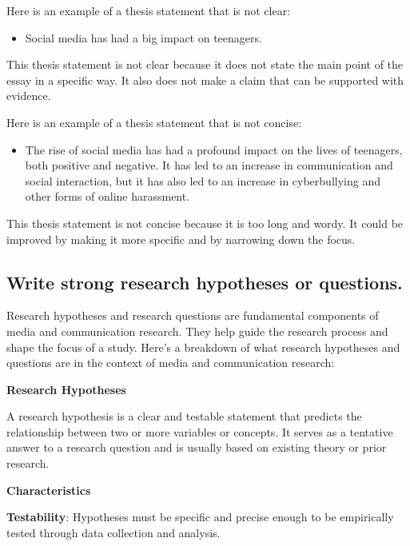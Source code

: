 \documentclass[
  b5paper]{book}
\providecommand{\tightlist}{%
  \setlength{\itemsep}{0pt}\setlength{\parskip}{0pt}}
\begin{document}
Here is an example of a thesis statement that is not clear:

\begin{itemize}
\tightlist
\item
  Social media has had a big impact on teenagers.
\end{itemize}

This thesis statement is not clear because it does not state the main point of the essay in a specific way. It also does not make a claim that can be supported with evidence.

Here is an example of a thesis statement that is not concise:

\begin{itemize}
\tightlist
\item
  The rise of social media has had a profound impact on the lives of teenagers, both positive and negative. It has led to an increase in communication and social interaction, but it has also led to an increase in cyberbullying and other forms of online harassment.
\end{itemize}

This thesis statement is not concise because it is too long and wordy. It could be improved by making it more specific and by narrowing down the focus.

\hypertarget{write-strong-research-hypotheses-or-questions.}{%
\subsection*{Write strong research hypotheses or questions.}\label{write-strong-research-hypotheses-or-questions.}}

Research hypotheses and research questions are fundamental components of media and communication research. They help guide the research process and shape the focus of a study. Here's a breakdown of what research hypotheses and questions are in the context of media and communication research:

\textbf{Research Hypotheses}

A research hypothesis is a clear and testable statement that predicts the relationship between two or more variables or concepts. It serves as a tentative answer to a research question and is usually based on existing theory or prior research.

\textbf{Characteristics}

\textbf{Testability}: Hypotheses must be specific and precise enough to be empirically tested through data collection and analysis.
\end{document}
